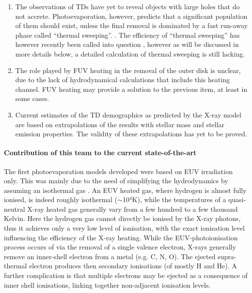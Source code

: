 \documentclass[10pt,fleqn,twoside]{article}
\begin{document}
\begin{enumerate}
\item The observations of TDs have yet to reveal objects with large
  holes that do not accrete. Photoevaporation, however, predicts that a
  significant population of them should exist, unless the final
  removal is dominated by a fast run-away
  phase called ``thermal sweeping''. 
  \citep{2012MNRAS.422.1880O}.
  The
  efficiency of  ``thermal sweeping'' has however recently been called
  into question 
  \citep{2016MNRAS.457.1905H}, however as will be discussed in more
  details below, a detailed calculation of thermal
  sweeping is still lacking. 
\item The role played by FUV heating in the removal of the outer disk
  is unclear, due to the lack of hydrodynamical calculations that
  include this heating channel. FUV heating may provide a solution to the
 previous item, at least in some cases. 
\item Current estimates of the TD demographics as predicted by the X-ray
  model are based on extrapolations of the results with stellar mass
  and stellar emission properties. The validity of these
  extrapolations has yet to be proved. 
\end{enumerate}

\paragraph{Contribution of this team to the current state-of-the-art}

The first photoevaporation models developed were based on EUV
irradiation only. This was mainly due to the need of simplifying the
hydrodynamics by assuming an isothermal gas
\citep[]{2006MNRAS.369..216A, 2006MNRAS.369..229A}. 
An EUV heated gas, where
hydrogen is almost fully ionised, is indeed roughly isothermal
($\sim$10$^4$K), while the temperatures of a quasi-neutral X-ray
heated gas generally vary from a few hundred to a few thousand 
Kelvin. Here the hydrogen gas cannot directly be ionised by the X-ray
photons, 
thus it achieves only a very low level of ionisation, with the
exact ionisation level influencing the efficiency of the X-ray
heating. While the EUV-photoionisation process occurs of via the removal
of a single valence electron, X-rays generally remove an inner-shell
electron from a metal (e.g. C, N, O). The ejected supra-thermal electron produces then secondary
ionisations (of mostly H and He). A further complication is that multiple electrons may be
ejected as a consequence of inner shell ionisations, linking together
non-adjacent ionisation levels.
\end{document}
